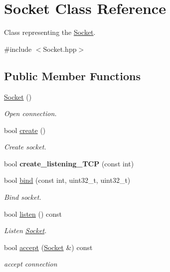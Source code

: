 \hypertarget{class_socket}{}\section{Socket Class Reference}
\label{class_socket}


Class representing the \hyperlink{class_socket}{Socket}.  




{\ttfamily \#include $<$Socket.\+hpp$>$}

\subsection*{Public Member Functions}
\begin{DoxyCompactItemize}
\item 
\hyperlink{class_socket_a7c3256c4fc6e2c603df73201049fae5a}{Socket} ()
\begin{DoxyCompactList}\small\item\em Open connection. \end{DoxyCompactList}\item 
bool \hyperlink{class_socket_a6afde2dca985dacdfa770141192e2daf}{create} ()
\begin{DoxyCompactList}\small\item\em Create socket. \end{DoxyCompactList}\item 
\mbox{\label{class_socket_aa4bd270e7bd26c1484c8cf1f114124ae}} 
bool {\bfseries create\+\_\+listening\+\_\+\+T\+CP} (const int)
\item 
bool \hyperlink{class_socket_ad345c15e8e9f12c8fda4117e9dcc5835}{bind} (const int, uint32\+\_\+t, uint32\+\_\+t)
\begin{DoxyCompactList}\small\item\em Bind socket. \end{DoxyCompactList}\item 
bool \hyperlink{class_socket_a4cafff80a6e9116615c663b58032e4c8}{listen} () const
\begin{DoxyCompactList}\small\item\em Listen \hyperlink{class_socket}{Socket}. \end{DoxyCompactList}\item 
bool \hyperlink{class_socket_a97890001096a3d61683992015eaffdfa}{accept} (\hyperlink{class_socket}{Socket} \&) const
\begin{DoxyCompactList}\small\item\em accept connection \end{DoxyCompactList}\item 

\end{DoxyCompactItemize}
